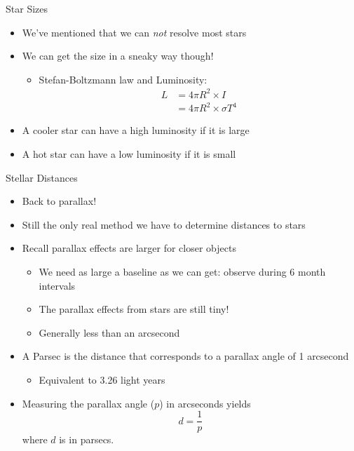 \documentclass[pdf,aspectratio=169]{beamer}
\begin{document}
\begin{frame}{Star Sizes}
  \begin{itemize}
	\item We've mentioned that we can \emph{not} resolve most stars
	\item We can get the size in a sneaky way though!
	  \begin{itemize}
		\item Stefan-Boltzmann law and Luminosity:
		  \begin{align*}
			L &= 4\pi R^2 \times I \\
			&= 4\pi R^2 \times \sigma T^4
		  \end{align*}
	  \end{itemize}
	\item A \textcolor{red!70!black}{cooler} star can have a high luminosity if it is {\LARGE large}
	\item A \textcolor{blue!40}{hot} star can have a low luminosity if it is {\scriptsize small}
  \end{itemize}
\end{frame}


\begin{frame}{Stellar Distances}
  \begin{itemize}
	\item Back to parallax!
	\item Still the only real method we have to determine distances to stars
	\item Recall parallax effects are larger for closer objects
	  \begin{itemize}
		\item We need as large a baseline as we can get: observe during 6 month intervals
		\item The parallax effects from stars are still tiny!
		\item Generally less than an arcsecond
	  \end{itemize}
	\item A \alert{Parsec} is the distance that corresponds to a parallax angle of 1 arcsecond
	  \begin{itemize}
		\item Equivalent to 3.26 light years
	  \end{itemize}
	\item Measuring the parallax angle ($p$) in arcseconds yields
	  \[d = \frac{1}{p}\]
	  where $d$ is in parsecs. 
  \end{itemize}
\end{frame}
\end{document}
